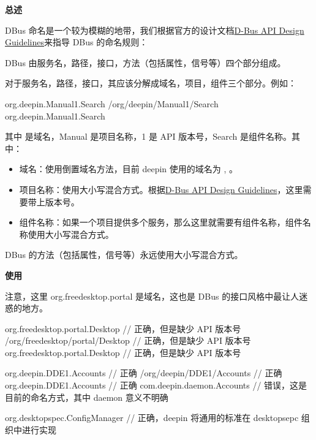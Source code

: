 \textbf{总述}

DBus 命名是一个较为模糊的地带，我们根据官方的设计文档\href{https://dbus.freedesktop.org/doc/dbus-api-design.html}{D-Bus API Design Guidelines}来指导 DBus 的命名规则：

DBus 由服务名，路径，接口，方法（包括属性，信号等）四个部分组成。

对于服务名，路径，接口，其应该分解成域名，项目，组件三个部分。例如：

\begin{cppcode}
  org.deepin.Manual1.Search
  /org/deepin/Manual1/Search
  org.deepin.Manual1.Search
\end{cppcode}

其中  是域名，Manual 是项目名称，1 是 API 版本号，Search 是组件名称。其中：

\begin{itemize}
  \item 域名：使用倒置域名方法，目前 deepin 使用的域名为 ,  。
  \item 项目名称：使用大小写混合方式。根据\href{https://dbus.freedesktop.org/doc/dbus-api-design.html}{D-Bus API Design Guidelines}，这里需要带上版本号。
  \item 组件名称：如果一个项目提供多个服务，那么这里就需要有组件名称，组件名称使用大小写混合方式。
\end{itemize}

DBus 的方法（包括属性，信号等）永远使用大小写混合方式。

\textbf{使用}

注意，这里 org.freedesktop.portal 是域名，这也是 DBus 的接口风格中最让人迷惑的地方。

\begin{cppcode}
  org.freedesktop.portal.Desktop      // 正确，但是缺少 API 版本号
  /org/freedesktop/portal/Desktop     // 正确，但是缺少 API 版本号
  org.freedesktop.portal.Desktop      // 正确，但是缺少 API 版本号
\end{cppcode}

\begin{cppcode}
  org.deepin.DDE1.Accounts       // 正确
  /org/deepin/DDE1/Accounts      // 正确
  org.deepin.DDE1.Accounts       // 正确
  com.deepin.daemon.Accounts     // 错误，这是目前的命名方式，其中 daemon 意义不明确

  org.desktopspec.ConfigManager  // 正确，deepin 将通用的标准在 desktopsepc 组织中进行实现
\end{cppcode}


